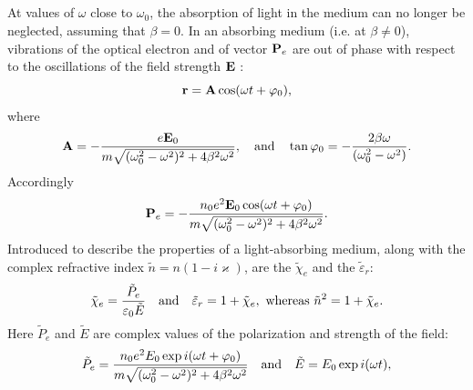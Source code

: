 \subsection{}\label{34.5.3} At values of $\omega$ close to $\omega_{0}$, the absorption of light in the medium can no longer be neglected, assuming that $\beta = 0$. In an absorbing medium (i.e. at $\beta \neq 0$), vibrations of the optical electron and of vector $\vb{P}_{e}$ are out of phase with respect to the oscillations of the field strength $\vb{E}$ :
\begin{equation*}%
\vb{r} = \vb{A} \cos (\omega t  + \varphi_{0}),
\end{equation*}
where
\begin{equation*}%
\vb{A} = - \frac{e \vb{E}_{0}}{m \sqrt{(\omega_{0}^{2} - \omega^{2})^{2} + 4 \beta^{2}\omega^{2}}}, \qand \tan \varphi_{0} = -\frac{2\beta \omega }{(\omega_{0}^{2} - \omega^{2})}.
\end{equation*}
Accordingly
\begin{equation*}%
\vb{P}_{e} = - \frac{n_{0}e^{2} \vb{E}_{0} \cos (\omega t + \varphi_{0})}{m \sqrt{(\omega_{0}^{2} - \omega^{2})^{2} + 4 \beta^{2}\omega^{2}}}.
\end{equation*}
Introduced to describe the properties of a light-absorbing medium, along with the complex refractive index  $\tilde{n} = n (1 - i \varkappa)$, are the  $\tilde{\chi}_{e}$ and the
 $\tilde{\varepsilon}_{r}$:
\begin{equation*}%
\tilde{\chi}_{e} = \frac{\tilde{P}_{e}}{\varepsilon_{0}\tilde{E}} \qand \tilde{\varepsilon}_{r} = 1 + \tilde{\chi}_{e}, \text{ whereas } \tilde{n}^{2} = 1 + \tilde{\chi}_{e}.
\end{equation*}
Here $\tilde{P}_{e}$ and $\tilde{E}$ are complex values of the polarization and strength of the field:
\begin{equation*}%
\tilde{P}_{e} = \frac{n_{0}e^{2}E_{0} \exp i(\omega t + \varphi_{0})}{m \sqrt{(\omega_{0}^{2} - \omega^{2})^{2} + 4 \beta^{2}\omega^{2}}} \qand \tilde{E} = E_{0} \exp i (\omega t),
\end{equation*}
